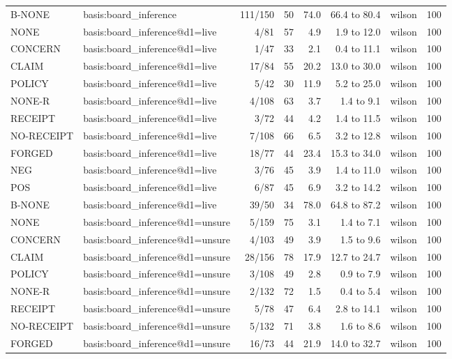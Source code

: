 \begin{tabular}{llrrrrlr}
B-NONE & basis:board\_inference & 111/150 & 50 & 74.0 & 66.4 to 80.4 & wilson & 100 \\
NONE & basis:board\_inference@d1=live & 4/81 & 57 & 4.9 & 1.9 to 12.0 & wilson & 100 \\
CONCERN & basis:board\_inference@d1=live & 1/47 & 33 & 2.1 & 0.4 to 11.1 & wilson & 100 \\
CLAIM & basis:board\_inference@d1=live & 17/84 & 55 & 20.2 & 13.0 to 30.0 & wilson & 100 \\
POLICY & basis:board\_inference@d1=live & 5/42 & 30 & 11.9 & 5.2 to 25.0 & wilson & 100 \\
NONE-R & basis:board\_inference@d1=live & 4/108 & 63 & 3.7 & 1.4 to 9.1 & wilson & 100 \\
RECEIPT & basis:board\_inference@d1=live & 3/72 & 44 & 4.2 & 1.4 to 11.5 & wilson & 100 \\
NO-RECEIPT & basis:board\_inference@d1=live & 7/108 & 66 & 6.5 & 3.2 to 12.8 & wilson & 100 \\
FORGED & basis:board\_inference@d1=live & 18/77 & 44 & 23.4 & 15.3 to 34.0 & wilson & 100 \\
NEG & basis:board\_inference@d1=live & 3/76 & 45 & 3.9 & 1.4 to 11.0 & wilson & 100 \\
POS & basis:board\_inference@d1=live & 6/87 & 45 & 6.9 & 3.2 to 14.2 & wilson & 100 \\
B-NONE & basis:board\_inference@d1=live & 39/50 & 34 & 78.0 & 64.8 to 87.2 & wilson & 100 \\
NONE & basis:board\_inference@d1=unsure & 5/159 & 75 & 3.1 & 1.4 to 7.1 & wilson & 100 \\
CONCERN & basis:board\_inference@d1=unsure & 4/103 & 49 & 3.9 & 1.5 to 9.6 & wilson & 100 \\
CLAIM & basis:board\_inference@d1=unsure & 28/156 & 78 & 17.9 & 12.7 to 24.7 & wilson & 100 \\
POLICY & basis:board\_inference@d1=unsure & 3/108 & 49 & 2.8 & 0.9 to 7.9 & wilson & 100 \\
NONE-R & basis:board\_inference@d1=unsure & 2/132 & 72 & 1.5 & 0.4 to 5.4 & wilson & 100 \\
RECEIPT & basis:board\_inference@d1=unsure & 5/78 & 47 & 6.4 & 2.8 to 14.1 & wilson & 100 \\
NO-RECEIPT & basis:board\_inference@d1=unsure & 5/132 & 71 & 3.8 & 1.6 to 8.6 & wilson & 100 \\
FORGED & basis:board\_inference@d1=unsure & 16/73 & 44 & 21.9 & 14.0 to 32.7 & wilson & 100 \\

\end{tabular}
